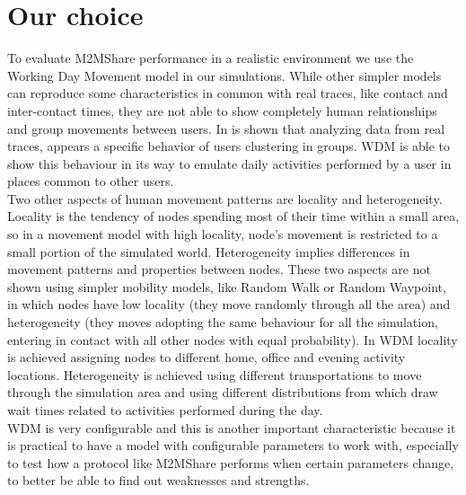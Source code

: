 \section{Our choice}
To evaluate M2MShare performance in a realistic environment we use the Working Day Movement model in our simulations. While other simpler models can reproduce some characteristics in common with real traces, like contact and inter-contact times, they are not able to show completely human relationships and group movements between users. In \cite{Natarajan:2007:UUI:1762888.1762904} is shown that analyzing data from real traces, appears a specific behavior of users clustering in groups. WDM is able to show this behaviour in its way to emulate daily activities performed by a user in places common to other users.
\\

Two other aspects of human movement patterns are locality and heterogeneity. Locality is the tendency of nodes spending most of their time within a small area, so in a movement model with high locality, node's movement is restricted to a small portion of the simulated world. Heterogeneity implies differences in movement patterns and properties between nodes. These two aspects are not shown using simpler mobility models, like Random Walk or Random Waypoint, in which nodes have low locality (they move randomly through all the area) and heterogeneity (they moves adopting the same behaviour for all the simulation, entering in contact with all other nodes with equal probability). In WDM locality is achieved assigning nodes to different home, office and evening activity locations. Heterogeneity is achieved using different transportations to move through the simulation area and using different distributions from which draw wait times related to activities performed during the day.
\\

WDM is very configurable and this is another important characteristic because it is practical to have a model with configurable parameters to work with, especially to test how a protocol like M2MShare performs when certain parameters change, to better be able to find out weaknesses and strengths.
 

